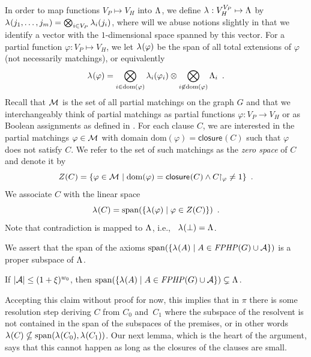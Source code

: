 \documentclass{theoretics}
\newcommand{\funcdescr}[3]{\ensuremath{ #1 : #2 \to #3}}
\newcommand{\set}[1]{\{ #1 \}}
\newcommand{\setdescr}[3][\mid]{\set{ #2 #1 #3 }}
\newcommand{\setsize}[1]{\lvert#1\rvert}
\newcommand{\introduceterm}[1]{{\emph{#1}}}
\newcommand{\eqperiod}{\enspace .}
\newcommand{\ie}{i.e.,\ }
\newcommand{\refpi}{\pi}
\newcommand{\clc}{\ensuremath{C}}
\newcommand{\restrict}[2]{{{#1}\!\!\upharpoonright_{#2}}}
\newcommand{\formulaformat}[1]{\mathit{#1}}
\newcommand{\graphfphpnot}[1][G]{\formulaformat{FPHP}({#1})}
\newcommand{\GFPHP}{G\text{-}FPHP}
\renewcommand{\GFPHP}{\graphfphpnot[G]}
\newcommand{\diff}{\xi}
\newcommand{\V}[1][]{V_{#1}}
\newcommand{\Vp}{\V[P]}
\newcommand{\Vh}{\V[H]}
\newcommand{\Ax}{\ensuremath\mathcal{A}}
\newcommand{\linspace}[1][]{\ensuremath \Lambda_{{#1}}}
\newcommand{\linmap}[1][]{\ensuremath \lambda_{{#1}}}
\newcommand{\linmapof}[2][]{\linmap[#1](#2)}
\newcommand{\closure}[2][]{\mathsf{closure}_{{#1}}(#2)}
\newcommand{\matcha}{\varphi}
\newcommand{\matchings}[1][]{\ensuremath \mathcal{M}_{{#1}}}
\newcommand{\Null}[1]{\ensuremath Z(#1)}
\newcommand{\spans}[1]{\mathrm{span} ( #1 )}
\newcommand{\dom}[1]{\mathrm{dom} ( #1 )}
\newcommand{\tensor}{\ensuremath \otimes}
\newcommand{\bigtensor}{\ensuremath \bigotimes}
\numberwithin{equation}{section}
\begin{document}
In order to map functions $\Vp \mapsto \Vh$ into $\linspace$, we define $\linmap : \Vh^{\Vp} \mapsto \linspace$ by 
$\linmapof{ j_1, \ldots, j_m} = \bigtensor_{i\in \Vp}
\linmapof[i]{j_i}$,
where will we abuse notions slightly in that we identify a vector with the
$1$\nobreakdash-di\-men\-sion\-al space spanned by this vector.
For a partial function $\matcha : \Vp \mapsto \Vh$, 
we
let $\linmapof{\matcha}$ 
be the span of all total extensions of $\matcha$ (not necessarily matchings), 
or equivalently
\begin{equation}
  \label{eq:lanbda-map-def}
  \linmapof{\matcha} = \bigtensor_{i \in \dom{\matcha}} 
  \linmapof[i]{\matcha_i} \tensor 
  \bigtensor_{ i \not \in \dom{\matcha}}\linspace[i] \eqperiod
\end{equation}
Recall that $\matchings$ is the set of all partial matchings on the
graph $G$ and that we interchangeably think of partial matchings as
partial functions $\funcdescr{\matcha}{\Vp}{\Vh}$ or as Boolean
assignments as defined in .
For each clause $C$, we are interested in the partial matchings
$\matcha \in \matchings$ with domain $ \dom{\matcha} = \closure{C} $
such that $\matcha$ does not satisfy $C$.  We refer to the set of such
matchings as the \introduceterm{zero space} of $\clc$ and denote it by
\begin{equation}\label{eq:def_null}
  \Null{C}
   = \set{\matcha \in \matchings \mid \dom{\matcha} = \closure{C} \wedge
     \restrict{C}{\matcha} \neq 1}
   \eqperiod
\end{equation}
We associate $C$ with the linear space
\begin{equation}
  \linmapof{C} = 
  \spans{ \setdescr{\linmapof{\matcha} }{ \matcha \in \Null{C}}} \eqperiod  
\end{equation}
Note that contradiction is mapped to $\linspace$, \ie
$\linmapof{\bot} = \linspace$. 

We assert that the span of the axioms
$\spans{\setdescr{\linmapof{A}}{A \in \GFPHP \cup \Ax}}$ 
is a proper subspace of $\linspace$.

\begin{lemma} \label{clm:fphp_spanL} \label{lem:fphp_spanL}
  If $\setsize{\Ax} \le (1 + \diff)^{w_0}$, then 
  $\spans{\setdescr{\linmapof{A}}{A \in \GFPHP \cup \Ax}} \subsetneq \linspace$.
\end{lemma}

Accepting this claim without proof for now, this implies that in
$\refpi$ there is some resolution step deriving $C$ from $C_0$
and~$C_1$ where the subspace of the resolvent is not contained in the
span of the subspaces of the premises, or in other words
$ \linmapof{C}
\nsubseteq 
\spans{\linmapof{C_0}, \linmapof{C_1}}
$.
Our next lemma, which is the heart of the argument,
says that this cannot happen 
as long as the closures of the clauses are small. 
\end{document}

